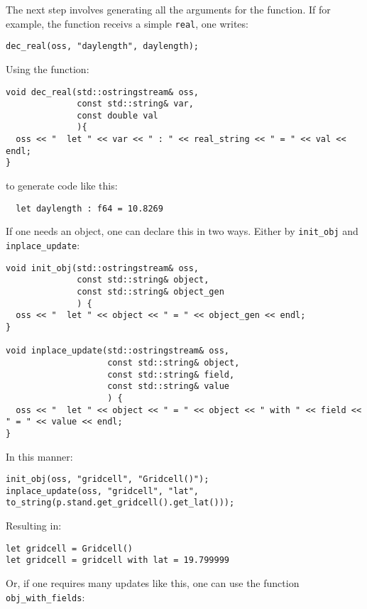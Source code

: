 The next step involves generating all the arguments for the function. If for example, the function receivs a simple \texttt{real}, one writes:

\begin{verbatim}
dec_real(oss, "daylength", daylength);
\end{verbatim}

Using the function:
\begin{verbatim}
void dec_real(std::ostringstream& oss,
              const std::string& var,
              const double val
              ){
  oss << "  let " << var << " : " << real_string << " = " << val << endl;
}
\end{verbatim}

to generate code like this:

\begin{verbatim}
  let daylength : f64 = 10.8269
\end{verbatim}

If one needs an object, one can declare this in two ways. Either by \texttt{init_obj} and \texttt{inplace_update}:

\begin{verbatim}
void init_obj(std::ostringstream& oss,
              const std::string& object,
              const std::string& object_gen
              ) {
  oss << "  let " << object << " = " << object_gen << endl;
}

void inplace_update(std::ostringstream& oss,
                    const std::string& object,
                    const std::string& field,
                    const std::string& value
                    ) {
  oss << "  let " << object << " = " << object << " with " << field << " = " << value << endl;
}
\end{verbatim}

In this manner:

\begin{verbatim}
init_obj(oss, "gridcell", "Gridcell()");
inplace_update(oss, "gridcell", "lat", to_string(p.stand.get_gridcell().get_lat()));
\end{verbatim}

Resulting in:

\begin{verbatim}
let gridcell = Gridcell()
let gridcell = gridcell with lat = 19.799999
\end{verbatim}

Or, if one requires many updates like this, one can use the function \texttt{obj_with_fields}:

